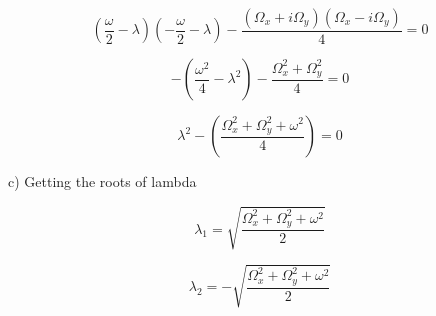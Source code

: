 \documentclass[]{article}
\begin{document}
\begin{equation}
        (\frac{\omega}{2}-\lambda)(-\frac{\omega}{2}-\lambda) - \frac{(\Omega_x + i\Omega_y)(\Omega_x - i\Omega_y)}{4} = 0
\end{equation}

\begin{equation}
        -(\frac{\omega^2}{4} - \lambda^2) - \frac{\Omega_x^2 + \Omega_y^2}{4} = 0
\end{equation}

\begin{equation}
      \lambda^2 - (\frac{\Omega_x^2 + \Omega_y^2 + \omega^2}{4}) = 0
\end{equation}

\vspace{0.5cm}
c) Getting the roots of lambda

$$\lambda_1 = \sqrt{\frac{\Omega_x^2 + \Omega_y^2 + \omega^2}{2}}$$

$$\lambda_2 = - \sqrt{\frac{\Omega_x^2 + \Omega_y^2 + \omega^2}{2}}$$
\end{document}
